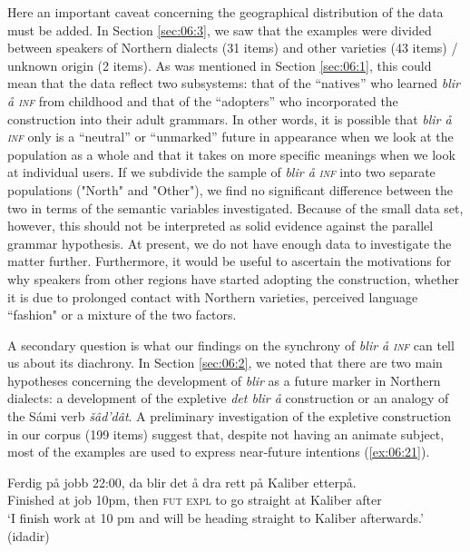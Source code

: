 \documentclass[output=paper,colorlinks,citecolor=brown]{langscibook}
\begin{document}
Here an important caveat concerning the geographical distribution of the data must be added. In Section \ref{sec:06:3}, we saw that the examples were divided between speakers of Northern dialects (31 items) and other varieties (43 items) / unknown origin (2 items). As was mentioned in Section \ref{sec:06:1}, this could mean that the data reflect two subsystems: that of the “natives” who learned \textit{blir å \textsc{inf}} from childhood and that of the “adopters” who incorporated the construction into their adult grammars. In other words, it is possible that \textit{blir å \textsc{inf}} only is a “neutral” or “unmarked” future in appearance when we look at the population as a whole and that it takes on more specific meanings when we look at individual users. If we subdivide the sample of \textit{blir å \textsc{inf}} into two separate populations ("North" and "Other"), we find no significant difference between the two in terms of the semantic variables investigated. Because of the small data set, however, this should not be interpreted as solid evidence against the parallel grammar hypothesis. At present, we do not have enough data to investigate the matter further. Furthermore, it would be useful to ascertain the motivations for why speakers from other regions have started adopting the construction, whether it is due to prolonged contact with Northern varieties, perceived language ``fashion" or a mixture of the two factors.

A secondary question is what our findings on the synchrony of \textit{blir å \textsc{inf}} can tell us about its diachrony. In Section \ref{sec:06:2}, we noted that there are two main hypotheses concerning the development of \textit{blir} as a future marker in Northern dialects: a development of the expletive \textit{det blir å} construction or an analogy of the Sámi verb \textit{šâd’dât}. A preliminary investigation of the expletive construction in our corpus (199 items) suggest that, despite not having an animate subject, most of the examples are used to express near-future intentions (\ref{ex:06:21}). 

\ea\label{ex:06:21}
\gll Ferdig på jobb 22:00, da blir det å dra rett på Kaliber etterpå.\\
     Finished at job 10pm, then  \textsc{fut} \textsc{expl} to go straight at Kaliber after\\
\glt ‘I finish work at 10 pm and will be heading straight to Kaliber afterwards.’ (idadir)
\z
\end{document}
